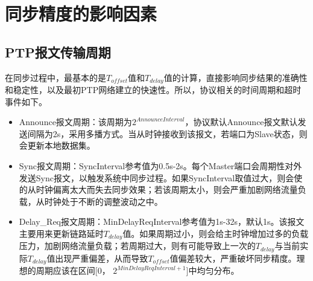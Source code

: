 \section{同步精度的影响因素}
\subsection{PTP报文传输周期}
在同步过程中，最基本的是$T_{offset}$值和$T_{delay}$值的计算，直接影响同步结果的准确性和稳定性，以及最初PTP网络建立的快速性。所以，协议相关的时间周期和超时事件如下。
\begin{itemize}[noitemsep,topsep=0pt,parsep=0pt,partopsep=0pt]
	\item Announce报文周期：该周期为$2^{AnnounceInterval}$，协议默认Announce报文默认发送间隔为2s，采用多播方式。当从时钟接收到该报文，若端口为Slave状态，则会更新本地数据集。
	\item Sync报文周期：SyncInterval参考值为0.5s-2s。每个Master端口会周期性对外发送Sync报文，以触发系统中同步过程。如果SyncInterval取值过大，则会使的从时钟偏离太大而失去同步效果；若该周期太小，则会严重加剧网络流量负载，从时钟处于不断的调整波动之中。
	\item Delay\_Req报文周期：MinDelayReqInterval参考值为1s-32s，默认1s。该报文主要用来更新链路延时$T_{delay}$值。如果周期过小，则会给主时钟增加过多的负载压力，加剧网络流量负载；若周期过大，则有可能导致上一次的$T_{delay}$与当前实际$T_{delay}$值出现严重偏差，从而导致$T_{offset}$值偏差较大，严重破坏同步精度。理想的周期应该在区间[0， $2^{MinDelayReqInterval+1}$]中均匀分布。
\end{itemize}




